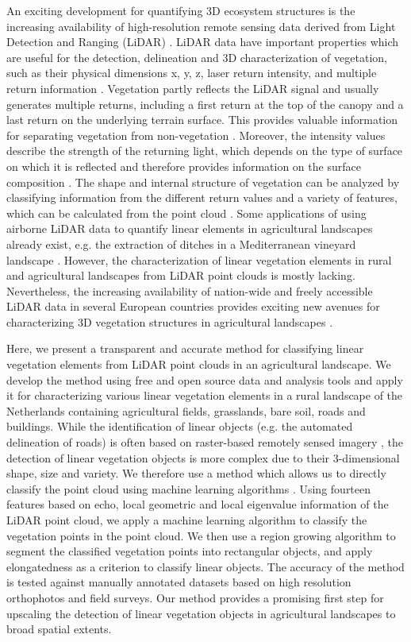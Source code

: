 An exciting development for quantifying 3D ecosystem structures is the increasing availability of high-resolution remote sensing data derived from Light Detection and Ranging (LiDAR) \citep{lim2003lidar}. LiDAR data have important properties which are useful for the detection, delineation and 3D characterization of vegetation, such as their physical dimensions x, y, z, laser return intensity, and multiple return information \citep{lefsky2002lidar, eitel2016beyond}. Vegetation partly reflects the LiDAR signal and usually generates multiple returns, including a first return at the top of the canopy and a last return on the underlying terrain surface. This provides valuable information for separating vegetation from non-vegetation \citep{lim2003lidar}. Moreover, the intensity values describe the strength of the returning light, which depends on the type of surface on which it is reflected and therefore provides information on the surface composition \citep{song2002assessing}. The shape and internal structure of vegetation can be analyzed by classifying information from the different return values and a variety of features, which can be calculated from the point cloud \citep{lim2003lidar, weinmann2015semantic}. Some applications of using airborne LiDAR data to quantify linear elements in agricultural landscapes already exist, e.g. the extraction of ditches in a Mediterranean vineyard landscape \citep{bailly2008agrarian}. However, the characterization of linear vegetation elements in rural and agricultural landscapes from LiDAR point clouds is mostly lacking. Nevertheless, the increasing availability of nation-wide and freely accessible LiDAR data in several European countries provides exciting new avenues for characterizing 3D vegetation structures in agricultural landscapes \citep{kissling2017eecolidar}.

Here, we present a transparent and accurate method for classifying linear vegetation elements from LiDAR point clouds in an agricultural landscape. We develop the method using free and open source data and analysis tools and apply it for characterizing various linear vegetation elements in a rural landscape of the Netherlands containing agricultural fields, grasslands, bare soil, roads and buildings. While the identification of linear objects (e.g. the automated delineation of roads) is often based on raster-based remotely sensed imagery \citep{quackenbush2004review}, the detection of linear vegetation objects is more complex due to their 3-dimensional shape, size and variety. We therefore use a method which allows us to directly classify the point cloud using machine learning algorithms \citep{yan2015urban}. Using fourteen features based on echo, local geometric and local eigenvalue information of the LiDAR point cloud, we apply a machine learning algorithm to classify the vegetation points in the point cloud. We then use a region growing algorithm to segment the classified vegetation points into rectangular objects, and apply elongatedness as a criterion to classify linear objects. The accuracy of the method is tested against manually annotated datasets based on high resolution orthophotos and field surveys. Our method provides a promising first step for upscaling the detection of linear vegetation objects in agricultural landscapes to broad spatial extents.